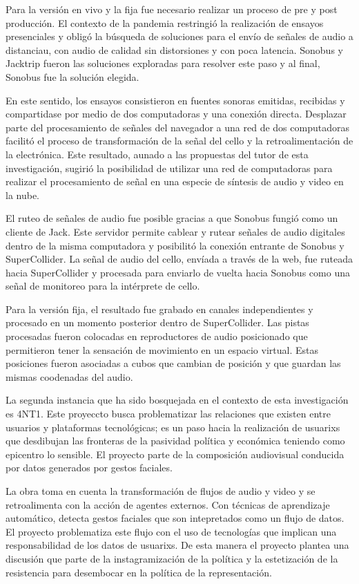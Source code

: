 Para la versión en vivo y la fija fue necesario realizar un proceso de pre y post producción. El contexto de la pandemia restringió la realización de ensayos presenciales y obligó la búsqueda de soluciones para el envío de señales de audio a distanciau, con audio de calidad sin distorsiones y con poca latencia. Sonobus y Jacktrip fueron las soluciones exploradas para resolver este paso y al final, Sonobus fue la solución elegida. 

En este sentido, los ensayos consistieron en fuentes sonoras emitidas, recibidas y compartidase por medio de dos computadoras y una conexión directa. Desplazar parte del procesamiento de señales del navegador a una red de dos computadoras facilitó el proceso de transformación de la señal del cello y la retroalimentación de la electrónica. Este resultado, aunado a las propuestas del tutor de esta investigación, sugirió la posibilidad de utilizar una red de computadoras para realizar el procesamiento de señal en una especie de síntesis de audio y video en la nube. 

El ruteo de señales de audio fue posible gracias a que Sonobus fungió como un cliente de Jack. Este servidor permite cablear y rutear señales de audio digitales dentro de la misma computadora y posibilitó la conexión entrante de Sonobus y SuperCollider. La señal de audio del cello, envíada a través de la web, fue ruteada hacia SuperCollider y procesada para enviarlo de vuelta hacia Sonobus como una señal de monitoreo para la intérprete de cello. 

Para la versión fija, el resultado fue grabado en canales independientes y procesado en un momento posterior dentro de SuperCollider. Las pistas procesadas fueron colocadas en reproductores de audio posicionado que permitieron tener la sensación de movimiento en un espacio virtual. Estas posiciones fueron asociadas a cubos que cambian de posición y que guardan las mismas coodenadas del audio. 

La segunda instancia que ha sido bosquejada en el contexto de esta investigación es 4NT1. Este proyeccto busca problematizar las relaciones que existen entre usuarios y plataformas tecnológicas; es un paso hacia la realización de usuarixs que desdibujan las fronteras de la pasividad política y económica teniendo como epicentro lo sensible. El proyecto parte de la composición audiovisual conducida por datos generados por gestos faciales. 

La obra toma en cuenta la transformación de flujos de audio y video y se retroalimenta con la acción de agentes externos. Con técnicas de aprendizaje automático, detecta gestos faciales que son intepretados como un flujo de datos. El proyecto problematiza este flujo con el uso de tecnologías que implican una responsabilidad de los datos de usuarixs. De esta manera el proyecto plantea una discusión que parte de la instagramización de la política y la estetización de la resistencia para desembocar en la política de la representación.


